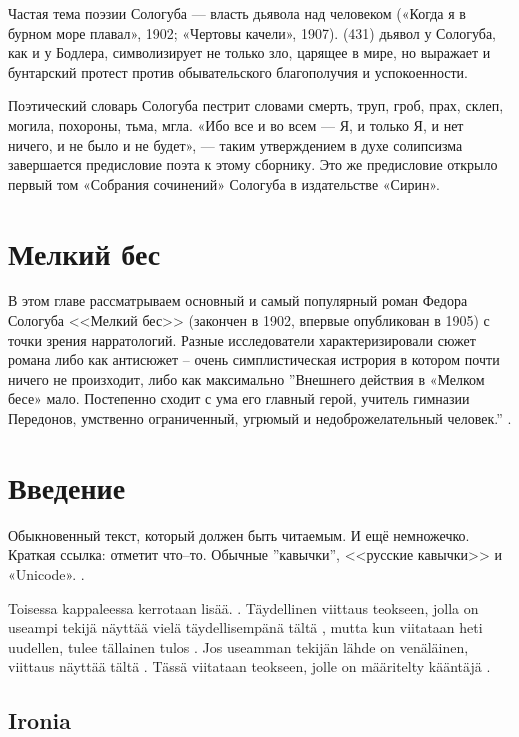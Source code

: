 \documentclass[12pt,a4paper]{article}
\begin{document}
Частая тема поэзии Сологуба — власть дьявола над человеком («Когда я в бурном море плавал», 1902; «Чертовы качели», 1907). (431)
дьявол у Сологуба, как и у Бодлера, символизирует не только зло, царящее в мире, но выражает и бунтарский протест против обывательского благополучия и успокоенности.

 Поэтический словарь Сологуба пестрит словами смерть, труп, гроб, прах, склеп, могила, похороны, тьма, мгла.
 «Ибо все и во всем — Я, и только Я, и нет ничего, и не было и не будет», — таким утверждением в духе солипсизма завершается предисловие поэта к этому сборнику. Это же предисловие открыло первый том «Собрания сочинений» Сологуба в издательстве «Сирин».




\section{Мелкий бес}

В этом главе рассматрываем основный и самый популярный роман Федора Сологуба <<Мелкий бес>> (закончен в 1902, впервые опубликован в 1905) с точки зрения нарратологий. Разные исследователи характеризировали сюжет романа либо как антисюжет -- очень симплистическая истрория в котором почти ничего не произходит, либо как максимально  
''Внешнего действия в «Мелком бесе» мало. Постепенно сходит с ума его главный герой, учитель гимназии Передонов, умственно ограниченный, угрюмый и недоброжелательный человек.''
\parencite[432]{grigorjev1983}.

\section{Введение}

Обыкновенный текст, который должен быть читаемым. И ещё немножечко. Краткая ссылка: \textcite[150--152]{kobrinski2013} отметит что–то. Обычные ''кавычки'', <<русские кавычки>> и «Unicode». \parencite[200]{kobrinski2013}.

Toisessa kappaleessa kerrotaan lisää. \parencite{shapir2007}. Täydellinen viittaus teokseen,
jolla on useampi tekijä näyttää vielä täydellisempänä
tältä \parencite[][268]{SKS2007}, mutta kun viitataan heti uudellen, tulee tällainen tulos
\parencite[50]{SKS2007}. Jos useamman tekijän lähde on venäläinen, viittaus näyttää tältä
\parencite{ljustrova1976}. Tässä viitataan teokseen, jolle on määritelty kääntäjä
\parencite[25]{ref:sologub1918}.

\subsection{Ironia}
\end{document}
